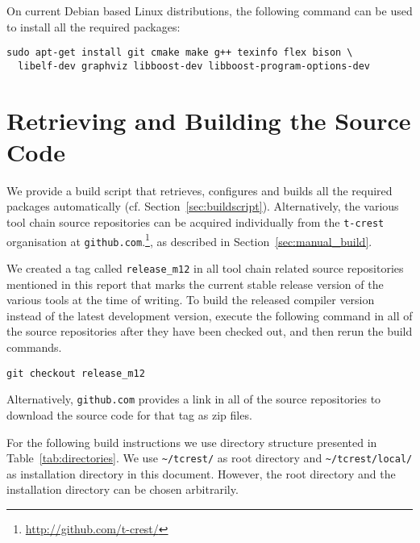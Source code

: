On current Debian based Linux distributions, the following command can be used to install
all the required packages:

\begin{verbatim}
sudo apt-get install git cmake make g++ texinfo flex bison \
  libelf-dev graphviz libboost-dev libboost-program-options-dev
\end{verbatim}

\section{Retrieving and Building the Source Code}

We provide a build script that retrieves, configures and builds all
the required packages automatically (cf. Section~\ref{sec:buildscript}).
Alternatively, the various tool chain source repositories can be acquired individually from 
the \texttt{t-crest} organisation at \texttt{github.com}.\footnote{\url{http://github.com/t-crest/}}, as
described in Section~\ref{sec:manual_build}. 

We created a tag called \texttt{release\_m12} in all tool chain related source repositories mentioned in this report
that marks the current stable release version of the various tools at the time of writing.
To build the released compiler version instead of the latest development version, execute the following command
in all of the source repositories after they have been checked out, and then rerun the build commands.

\begin{verbatim}
git checkout release_m12
\end{verbatim}

Alternatively, \texttt{github.com} provides a link in all of the source repositories to download the source code for that tag as 
zip files.



For the following build instructions we use directory structure presented in Table~\ref{tab:directories}. 
We use \texttt{\textasciitilde/tcrest/} as root directory and \texttt{\textasciitilde/tcrest/local/}
as installation directory in this document. However, the root directory and the installation directory
can be chosen arbitrarily.

